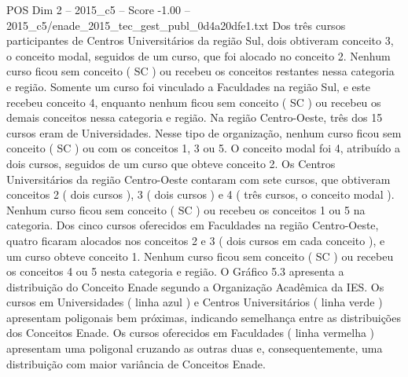 \begin{textsample}{POS Dim 2 – 2015\_c5 – Score -1.00 – 2015\_c5/enade\_2015\_tec\_gest\_publ\_0d4a20dfe1.txt}
Dos três cursos participantes de Centros Universitários da região Sul, dois obtiveram conceito 3, o conceito modal, seguidos de um curso, que foi alocado no conceito 2.
Nenhum curso ficou sem conceito ( SC ) ou recebeu os conceitos restantes nessa categoria e região.
Somente um curso foi vinculado a Faculdades na região Sul, e este recebeu conceito 4, enquanto nenhum ficou sem conceito ( SC ) ou recebeu os demais conceitos nessa categoria e região.
Na região Centro-Oeste, três dos 15 cursos eram de Universidades.
Nesse tipo de organização, nenhum curso ficou sem conceito ( SC ) ou com os conceitos 1, 3 ou 5.
O conceito modal foi 4, atribuído a dois cursos, seguidos de um curso que obteve conceito 2.
Os Centros Universitários da região Centro-Oeste contaram com sete cursos, que obtiveram conceitos 2 ( dois cursos ), 3 ( dois cursos ) e 4 ( três cursos, o conceito modal ).
Nenhum curso ficou sem conceito ( SC ) ou recebeu os conceitos 1 ou 5 na categoria.
Dos cinco cursos oferecidos em Faculdades na região Centro-Oeste, quatro ficaram alocados nos conceitos 2 e 3 ( dois cursos em cada conceito ), e um curso obteve conceito 1.
Nenhum curso ficou sem conceito ( SC ) ou recebeu os conceitos 4 ou 5 nesta categoria e região.
O Gráfico 5.3 apresenta a distribuição do Conceito Enade segundo a Organização Acadêmica da IES.
Os cursos em Universidades ( linha azul ) e Centros Universitários ( linha verde ) apresentam poligonais bem próximas, indicando semelhança entre as distribuições dos Conceitos Enade.
Os cursos oferecidos em Faculdades ( linha vermelha ) apresentam uma poligonal cruzando as outras duas e, consequentemente, uma distribuição com maior variância de Conceitos Enade.

\end{textsample}
